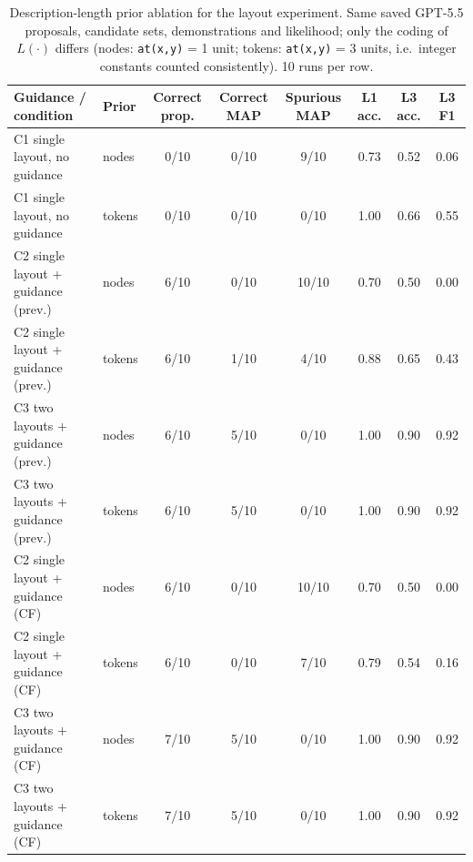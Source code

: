 \begin{table}[t]
\centering\small
\caption{Description-length prior ablation for the layout experiment. Same saved GPT-5.5 proposals, candidate sets, demonstrations and likelihood; only the coding of $L(\cdot)$ differs (nodes: \texttt{at(x,y)} = 1 unit; tokens: \texttt{at(x,y)} = 3 units, i.e.\ integer constants counted consistently). 10 runs per row.}
\label{tab:dl-ablation}
\begin{tabular}{llcccccc}
\toprule
Guidance / condition & Prior & Correct prop. & Correct MAP & Spurious MAP & L1 acc. & L3 acc. & L3 F1 \\
\midrule
C1 single layout, no guidance & nodes & 0/10 & 0/10 & 9/10 & 0.73 & 0.52 & 0.06 \\
C1 single layout, no guidance & tokens & 0/10 & 0/10 & 0/10 & 1.00 & 0.66 & 0.55 \\
C2 single layout + guidance (prev.) & nodes & 6/10 & 0/10 & 10/10 & 0.70 & 0.50 & 0.00 \\
C2 single layout + guidance (prev.) & tokens & 6/10 & 1/10 & 4/10 & 0.88 & 0.65 & 0.43 \\
C3 two layouts + guidance (prev.) & nodes & 6/10 & 5/10 & 0/10 & 1.00 & 0.90 & 0.92 \\
C3 two layouts + guidance (prev.) & tokens & 6/10 & 5/10 & 0/10 & 1.00 & 0.90 & 0.92 \\
\midrule
C2 single layout + guidance (CF) & nodes & 6/10 & 0/10 & 10/10 & 0.70 & 0.50 & 0.00 \\
C2 single layout + guidance (CF) & tokens & 6/10 & 0/10 & 7/10 & 0.79 & 0.54 & 0.16 \\
C3 two layouts + guidance (CF) & nodes & 7/10 & 5/10 & 0/10 & 1.00 & 0.90 & 0.92 \\
C3 two layouts + guidance (CF) & tokens & 7/10 & 5/10 & 0/10 & 1.00 & 0.90 & 0.92 \\
\bottomrule
\end{tabular}
\end{table}
